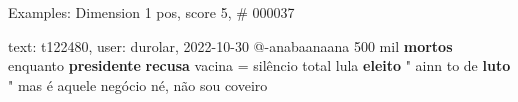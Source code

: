\begin{frame}{Examples: Dimension 1 pos, score 5, \# 000037}
\footnotesize
\begin{exampleblock}{text: t122480, user: durolar, 2022-10-30}
@-anabaanaana 500 mil \textbf{mortos} enquanto \textbf{presidente} 
\textbf{recusa} vacina = silêncio total lula \textbf{eleito} " ainn to de 
\textbf{luto}   " mas é 
aquele negócio né, não sou coveiro  
\end{exampleblock}
\end{frame}

